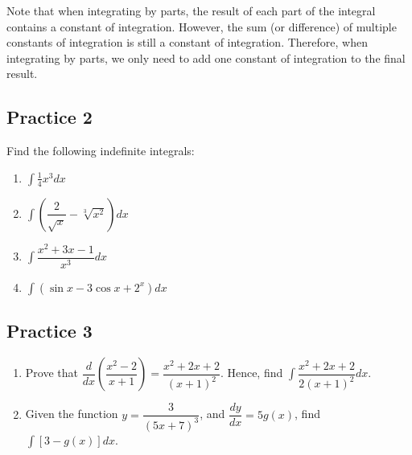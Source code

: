 \documentclass{report}
\begin{document}
Note that when integrating by parts, the result of each part of the integral
contains a constant of integration. However, the sum (or difference) of
multiple constants of integration is still a constant of integration.
Therefore, when integrating by parts, we only need to add one constant of
integration to the final result.

\subsection{Practice 2}
Find the following indefinite integrals:
\begin{enumerate}
    \item $\displaystyle\int{\frac{1}{4}}x^{3}dx$
    \item $\displaystyle\int{\left(\dfrac{2}{\sqrt{x}} - \sqrt[3]{x^2}\right)dx}$
    \item $\displaystyle\int{\dfrac{x^2 + 3x - 1}{x^3}}dx$
    \item $\displaystyle\int{\left(\sin x - 3\cos x + 2^x\right)dx}$
\end{enumerate}

\subsection{Practice 3}
\begin{enumerate}
    \item Prove that $\dfrac{d}{dx}\left(\dfrac{x^2 - 2}{x + 1}\right) = \dfrac{x^2 + 2x
                  + 2}{(x + 1)^2}$. Hence, find $\displaystyle\int{\dfrac{x^2 + 2x +
                      2}{2(x+1)^2}}dx$.
    \item Given the function $y = \dfrac{3}{(5x + 7)^3}$, and $\dfrac{dy}{dx} = 5g(x)$,
          find $\displaystyle\int\left[3 - g(x)\right]dx$.
\end{enumerate}
\end{document}
